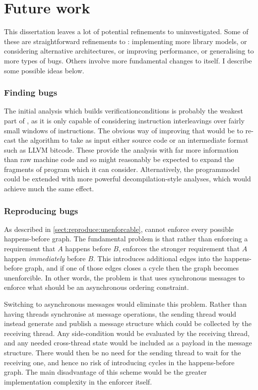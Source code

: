 \chapter{Future work}

This dissertation leaves a lot of potential refinements to
{\technique} uninvestigated.  Some of these are straightforward
refinements to {\implementation}: implementing more {\StateMachine}
library models, or considering alternative architectures, or improving
performance, or generalising to more types of bugs.  Others involve
more fundamental changes to {\technique} itself.  I describe some
possible ideas below.

\subsection{Finding bugs}

The initial analysis which builds \glspl{verificationcondition} is
probably the weakest part of {\technique}, as it is only capable of
considering instruction interleavings over fairly small windows of
instructions.  The obvious way of improving that would be to re-cast
the algorithm to take as input either source code or an intermediate
format such as LLVM bitcode\needCite{}.  These provide the analysis
with far more information than raw machine code and so might
reasonably be expected to expand the fragments of program which it can
consider.  Alternatively, the \gls{programmodel} could be extended
with more powerful decompilation-style analyses, which would achieve
much the same effect.

\subsection{Reproducing bugs}

As described in \autoref{sect:reproduce:unenforcable}, {\technique}
cannot enforce every possible happens-before graph.  The fundamental
problem is that rather than enforcing a requirement that $A$ happens
before $B$, {\technique} enforces the stronger requirement that $A$
happen \emph{immediately} before $B$.  This introduces additional edges
into the happens-before graph, and if one of those edges closes a
cycle then the graph becomes unenforcible.  In other words, the
problem is that {\technique} uses synchronous messages to enforce what
should be an asynchronous ordering constraint.

Switching to asynchronous messages would eliminate this problem.
Rather than having threads synchronise at message operations, the
sending thread would instead generate and publish a message structure
which could be collected by the receiving thread.  Any side-condition
would be evaluated by the receiving thread, and any needed
cross-thread state would be included as a payload in the message
structure.  There would then be no need for the sending thread to wait
for the receiving one, and hence no risk of introducing cycles in the
happens-before graph.  The main disadvantage of this scheme would be
the greater implementation complexity in the enforcer itself.

